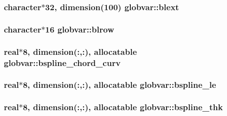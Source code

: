 \subsubsection[{blext}]{\setlength{\rightskip}{0pt plus 5cm}character$\ast$32, dimension(100) globvar\+::blext}\label{namespaceglobvar_afebc24dd143d18989fbeb7223a277ab8}
\hypertarget{namespaceglobvar_ae058016a63919ba09dda0290e83e60a0}{}
\subsubsection[{blrow}]{\setlength{\rightskip}{0pt plus 5cm}character$\ast$16 globvar\+::blrow}\label{namespaceglobvar_ae058016a63919ba09dda0290e83e60a0}
\hypertarget{namespaceglobvar_ac2712a968280dc32e12e905f6cc3cc91}{}
\subsubsection[{bspline\+\_\+chord\+\_\+curv}]{\setlength{\rightskip}{0pt plus 5cm}real$\ast$8, dimension(\+:,\+:), allocatable globvar\+::bspline\+\_\+chord\+\_\+curv}\label{namespaceglobvar_ac2712a968280dc32e12e905f6cc3cc91}
\hypertarget{namespaceglobvar_a5c6f14b2066b824a38b5a56803ec5c3a}{}
\subsubsection[{bspline\+\_\+le}]{\setlength{\rightskip}{0pt plus 5cm}real$\ast$8, dimension(\+:,\+:), allocatable globvar\+::bspline\+\_\+le}\label{namespaceglobvar_a5c6f14b2066b824a38b5a56803ec5c3a}
\hypertarget{namespaceglobvar_af72c9cb4baffb66f0f81b68cef5018e8}{}
\subsubsection[{bspline\+\_\+thk}]{\setlength{\rightskip}{0pt plus 5cm}real$\ast$8, dimension(\+:,\+:), allocatable globvar\+::bspline\+\_\+thk}\label{namespaceglobvar_af72c9cb4baffb66f0f81b68cef5018e8}
\hypertarget{namespaceglobvar_af5f7b2251f75b81eeb565207d1b40aab}{}

